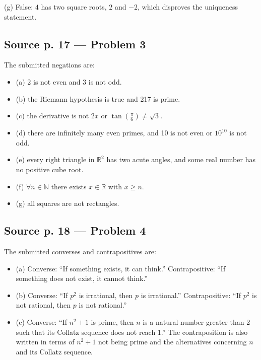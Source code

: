 (g) False: \(4\) has two square roots, \(2\) and \(- 2\), which disproves the uniqueness statement.

\subsection{Source p. 17 --- Problem 3}

The submitted negations are:

\begin{itemize}
\tightlist
\item
  (a) 2 is not even and 3 is not odd.
\item
  (b) the Riemann hypothesis is true and 217 is prime.
\item
  (c) the derivative is not \(2x\) or \(\tan\left( \frac{\pi}{6} \right) \neq \sqrt{3}\).
\item
  (d) there are infinitely many even primes, and 10 is not even or \(10^{10}\) is not odd.
\item
  (e) every right triangle in \(\mathbb{R}^{2}\) has two acute angles, and some real number has no positive cube root.
\item
  (f) \(\forall n \in \mathbb{N}\) there exists \(x \in \mathbb{R}\) with \(x \geq n\).
\item
  (g) all squares are not rectangles.
\end{itemize}

\subsection{Source p. 18 --- Problem 4}

The submitted converses and contrapositives are:

\begin{itemize}
\tightlist
\item
  (a) Converse: ``If something exists, it can think.'' Contrapositive: ``If something does not exist, it cannot think.''
\item
  (b) Converse: ``If \(p^{2}\) is irrational, then \(p\) is irrational.'' Contrapositive: ``If \(p^{2}\) is not rational, then \(p\) is not rational.''
\item
  (c) Converse: ``If \(n^{2} + 1\) is prime, then \(n\) is a natural number greater than 2 such that its Collatz sequence does not reach 1.'' The contraposition is also written in terms of \(n^{2} + 1\) not being prime and the alternatives concerning \(n\) and its Collatz sequence.
\end{itemize}

